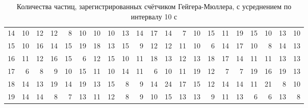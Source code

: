 \documentclass[12pt]{article}
\begin{document}
\begin{table}[H]
\begin{center}
\begin{tabular}{|l|r|r|r|r|r|r|r|r|r|r|r|r|r|r|r|r|r|r|r|r|}
            14 & 10 & 12 & 12 & 8  & 10 & 10 & 10 & 13 & 14 & 17 & 14 & 7  & 10 & 15 & 11 & 19 & 15 & 10 & 13 & 10 \\
            15 & 10 & 16 & 14 & 15 & 19 & 18 & 13 & 15 & 9  & 12 & 12 & 11 & 10 & 6  & 14 & 17 & 10 & 8  & 14 & 13 \\
            16 & 11 & 12 & 16 & 15 & 6  & 12 & 15 & 10 & 11 & 18 & 13 & 12 & 13 & 18 & 17 & 14 & 11 & 11 & 13 & 13 \\
            17 & 6  & 8  & 9  & 10 & 15 & 11 & 10 & 14 & 11 & 6  & 10 & 11 & 19 & 12 & 7  & 7  & 19 & 16 & 19 & 13 \\
            18 & 14 & 13 & 19 & 14 & 19 & 13 & 15 & 8  & 9  & 14 & 24 & 17 & 15 & 12 & 14 & 14 & 11 & 21 & 8  & 10 \\
            19 & 14 & 14 & 8  & 7  & 13 & 11 & 12 & 8  & 9  & 10 & 15 & 13 & 13 & 9  & 11 & 13 & 6  & 6  & 13 & 8  \\
            \hline
        \end{tabular}
    \end{center}
    \caption{Количества частиц, зарегистрированных счётчиком Гейгера-Мюллера, с усреднением по интервалу 10 с}
    \label{tab:1}
\end{table}
\end{document}

